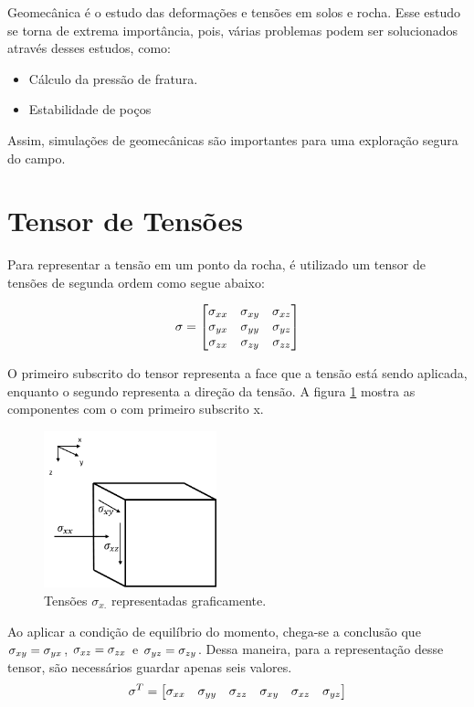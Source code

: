 


Geomecânica é o estudo das deformações e tensões em solos e rocha. Esse estudo se torna de extrema importância, pois, várias problemas podem ser solucionados através desses estudos, como:
\begin{itemize}
    \item Cálculo da pressão de fratura.
    \item Estabilidade de poços
\end{itemize}

Assim, simulações de geomecânicas são importantes para uma exploração segura do campo.

\section{Tensor de Tensões}

Para representar a tensão em um ponto da rocha, é utilizado um tensor de tensões de segunda ordem como segue abaixo:

\begin{equation}
\mathbf{\sigma} =
    \begin{bmatrix}
    \sigma_{xx} & \sigma_{xy} & \sigma_{xz} \\
    \sigma_{yx} & \sigma_{yy} & \sigma_{yz} \\
    \sigma_{zx} & \sigma_{zy} & \sigma_{zz}
    \end{bmatrix}
\end{equation}

O primeiro subscrito do tensor representa a face que a tensão está sendo aplicada, enquanto o segundo representa a direção da tensão. A figura \ref{fig:tensoesx} mostra as componentes com o com primeiro subscrito x.


\begin{figure}[!htbp]
\label{fig:tensoesx}
\centering
\includegraphics[width=5cm]{chap01/tensor.png}
\caption{Tensões $\sigma_{x.}$ representadas graficamente.}
\end{figure}

Ao aplicar a condição de equilíbrio do momento, chega-se a conclusão que $\sigma_{xy}=\sigma_{yx}$, $\sigma_{xz}=\sigma_{zx}$ e $\sigma_{yz}=\sigma_{zy}$. Dessa maneira, para a representação desse tensor, são necessários guardar apenas seis valores.
\begin{equation}
\label{eq:tensor6}
\sigma^T = \begin{bmatrix}
\sigma_{xx} & \sigma_{yy} & \sigma_{zz} & \sigma_{xy} & \sigma_{xz} & \sigma_{yz}
\end{bmatrix}
\end{equation}

